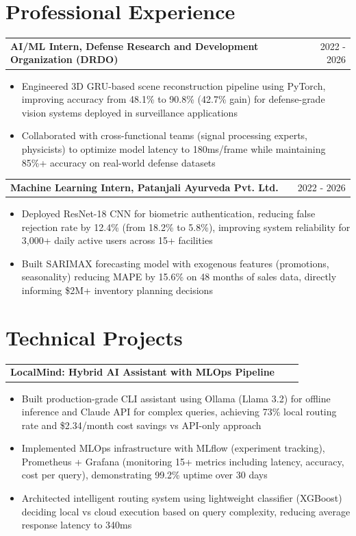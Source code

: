 \documentclass[a4paper,10pt]{article}
\makeatletter
\newenvironment{joblong}[2]
    {
    \begin{tabularx}{\linewidth}{@{}l >{\raggedright\arraybackslash}X r@{}}
    \textbf{#1} & \hfill &  #2 \\[1.0pt]
    \end{tabularx}
    \begin{minipage}[t]{\linewidth}
    \begin{itemize}[nosep,after=\strut, leftmargin=1em, itemsep=1.5pt]
    }
    {
    \end{itemize}
    \end{minipage}    
    }
\makeatother
\begin{document}
\section{Professional Experience}

\begin{joblong}{AI/ML Intern, Defense Research and Development Organization (DRDO)}{2022 - 2026}
\item Engineered 3D GRU-based scene reconstruction pipeline using PyTorch, improving accuracy from 48.1\% to 90.8\% (42.7\% gain) for defense-grade vision systems deployed in surveillance applications
\item Collaborated with cross-functional teams (signal processing experts, physicists) to optimize model latency to 180ms/frame while maintaining 85\%+ accuracy on real-world defense datasets
\end{joblong}

\begin{joblong}{Machine Learning Intern, Patanjali Ayurveda Pvt. Ltd.}{2022 - 2026}
\item Deployed ResNet-18 CNN for biometric authentication, reducing false rejection rate by 12.4\% (from 18.2\% to 5.8\%), improving system reliability for 3,000+ daily active users across 15+ facilities
\item Built SARIMAX forecasting model with exogenous features (promotions, seasonality) reducing MAPE by 15.6\% on 48 months of sales data, directly informing \$2M+ inventory planning decisions
\end{joblong}

\section{Technical Projects}

\begin{joblong}{LocalMind: Hybrid AI Assistant with MLOps Pipeline}{}
\item Built production-grade CLI assistant using Ollama (Llama 3.2) for offline inference and Claude API for complex queries, achieving 73\% local routing rate and \$2.34/month cost savings vs API-only approach
\item Implemented MLOps infrastructure with MLflow (experiment tracking), Prometheus + Grafana (monitoring 15+ metrics including latency, accuracy, cost per query), demonstrating 99.2\% uptime over 30 days
\item Architected intelligent routing system using lightweight classifier (XGBoost) deciding local vs cloud execution based on query complexity, reducing average response latency to 340ms
\end{joblong}
\end{document}
